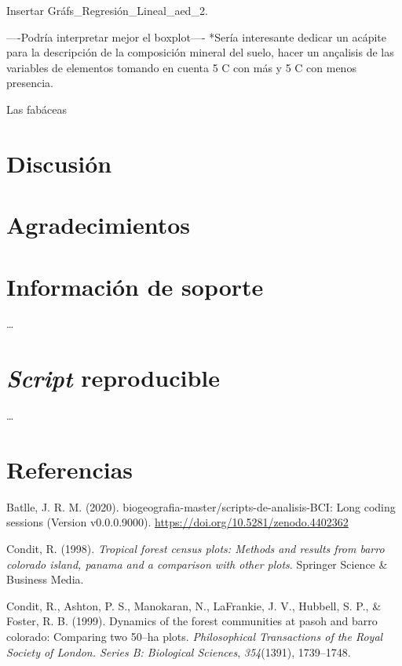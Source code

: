 \documentclass[11pt,]{article}
\begin{document}
Insertar Gráfs\_Regresión\_Lineal\_aed\_2.

----Podría interpretar mejor el boxplot---- *Sería interesante dedicar
un acápite para la descripción de la composición mineral del suelo,
hacer un ançalisis de las variables de elementos tomando en cuenta 5 C
con más y 5 C con menos presencia.

Las fabáceas

\section{Discusión}\label{discusiuxf3n}

\section{Agradecimientos}\label{agradecimientos}

\section{Información de soporte}\label{informaciuxf3n-de-soporte}

\ldots

\section{\texorpdfstring{\emph{Script}
reproducible}{Script reproducible}}\label{script-reproducible}

\ldots

\section*{Referencias}\label{referencias}

\hypertarget{refs}{}
\hypertarget{ref-jose_ramon_martinez_batlle_2020_4402362}{}
Batlle, J. R. M. (2020). biogeografia-master/scripts-de-analisis-BCI:
Long coding sessions (Version v0.0.0.9000).
\url{https://doi.org/10.5281/zenodo.4402362}

\hypertarget{ref-condit1998tropical}{}
Condit, R. (1998). \emph{Tropical forest census plots: Methods and
results from barro colorado island, panama and a comparison with other
plots}. Springer Science \& Business Media.

\hypertarget{ref-condit1999dynamics}{}
Condit, R., Ashton, P. S., Manokaran, N., LaFrankie, J. V., Hubbell, S.
P., \& Foster, R. B. (1999). Dynamics of the forest communities at pasoh
and barro colorado: Comparing two 50--ha plots. \emph{Philosophical
Transactions of the Royal Society of London. Series B: Biological
Sciences}, \emph{354}(1391), 1739--1748.
\end{document}
